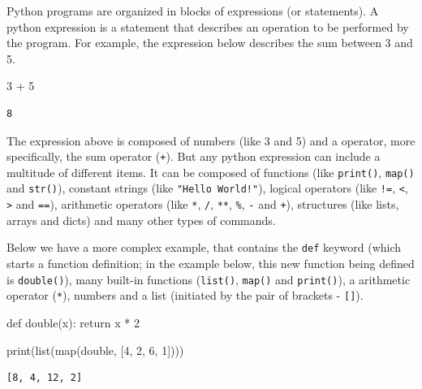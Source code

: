 \documentclass[
  11pt,
  letterpaper,
  DIV=11,
  numbers=noendperiod]{scrreprt}
\newenvironment{Shaded}{\begin{snugshade}}{\end{snugshade}}
\newcommand{\BuiltInTok}[1]{\textcolor[rgb]{0.00,0.23,0.31}{#1}}
\newcommand{\ControlFlowTok}[1]{\textcolor[rgb]{0.00,0.23,0.31}{#1}}
\newcommand{\DecValTok}[1]{\textcolor[rgb]{0.68,0.00,0.00}{#1}}
\newcommand{\KeywordTok}[1]{\textcolor[rgb]{0.00,0.23,0.31}{#1}}
\newcommand{\NormalTok}[1]{\textcolor[rgb]{0.00,0.23,0.31}{#1}}
\newcommand{\OperatorTok}[1]{\textcolor[rgb]{0.37,0.37,0.37}{#1}}
\begin{document}
Python programs are organized in blocks of expressions (or statements).
A python expression is a statement that describes an operation to be
performed by the program. For example, the expression below describes
the sum between 3 and 5.

\begin{Shaded}
\begin{Highlighting}[]
\DecValTok{3} \OperatorTok{+} \DecValTok{5}
\end{Highlighting}
\end{Shaded}

\begin{verbatim}
8
\end{verbatim}

The expression above is composed of numbers (like 3 and 5) and a
operator, more specifically, the sum operator (\texttt{+}). But any
python expression can include a multitude of different items. It can be
composed of functions (like \texttt{print()}, \texttt{map()} and
\texttt{str()}), constant strings (like \texttt{"Hello\ World!"}),
logical operators (like \texttt{!=}, \texttt{\textless{}},
\texttt{\textgreater{}} and \texttt{==}), arithmetic operators (like
\texttt{*}, \texttt{/}, \texttt{**}, \texttt{\%}, \texttt{-} and
\texttt{+}), structures (like lists, arrays and dicts) and many other
types of commands.

Below we have a more complex example, that contains the \texttt{def}
keyword (which starts a function definition; in the example below, this
new function being defined is \texttt{double()}), many built-in
functions (\texttt{list()}, \texttt{map()} and \texttt{print()}), a
arithmetic operator (\texttt{*}), numbers and a list (initiated by the
pair of brackets - \texttt{{[}{]}}).

\begin{Shaded}
\begin{Highlighting}[]
\KeywordTok{def}\NormalTok{ double(x):}
  \ControlFlowTok{return}\NormalTok{ x }\OperatorTok{*} \DecValTok{2}
  
\BuiltInTok{print}\NormalTok{(}\BuiltInTok{list}\NormalTok{(}\BuiltInTok{map}\NormalTok{(double, [}\DecValTok{4}\NormalTok{, }\DecValTok{2}\NormalTok{, }\DecValTok{6}\NormalTok{, }\DecValTok{1}\NormalTok{])))}
\end{Highlighting}
\end{Shaded}

\begin{verbatim}
[8, 4, 12, 2]
\end{verbatim}
\end{document}
